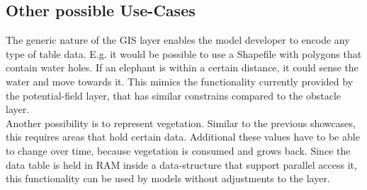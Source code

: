\subsection{Other possible Use-Cases}
The generic nature of the GIS layer enables the model developer to encode any type of table data. E.g. it would be possible to use a Shapefile with polygons that contain water holes. If an elephant is within a certain distance, it could sense the water and move towards it. This mimics the functionality currently provided by the potential-field layer, that has similar constrains compared to the obstacle layer.\\
Another possibility is to represent vegetation. Similar to the previous showcases, this requires areas that hold certain data. Additional these values have to be able to change over time, because vegetation is consumed and grows back. Since the data table is held in RAM inside a data-structure that support parallel access it, this functionality can be used by models without adjustments to the layer.
